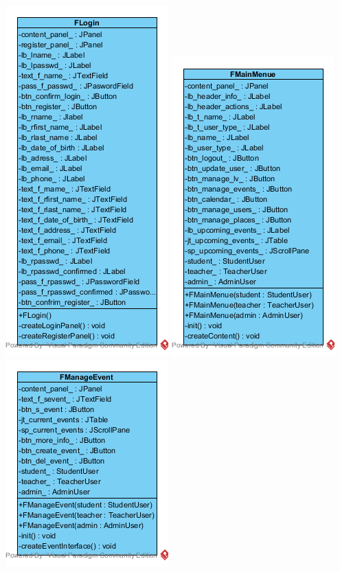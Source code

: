 \documentclass[a4paper,12pt]{article}
\begin{document}
\begin{center}
	\includegraphics[scale=1]{cFLogin.png}
	\includegraphics[scale=1]{cFMainMenue.png}
	\includegraphics[scale=1]{cFManageEvent.png}

\end{center}
\end{document}
